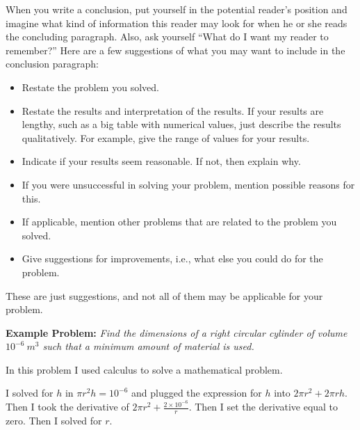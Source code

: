 When you write a conclusion, put yourself in the potential reader's
position and imagine what kind of information this reader may look for
when he or she reads the concluding paragraph.  Also, ask yourself
``What do I want my reader to remember?''  Here are a few suggestions
of what you may want to include in the conclusion paragraph:

\begin{itemize}
\item Restate the problem you solved.
\item Restate the results and interpretation of the results. If your
  results are lengthy, such as a big table with numerical values,
  just  describe the results qualitatively. For example,
  give the range of values for your results.
\item Indicate if your results seem reasonable. If not, then explain why.
\item If you were unsuccessful in solving your problem, mention
  possible reasons for this.
\item If applicable, mention other problems that are related to the
  problem you solved.
\item Give suggestions for improvements, i.e., what else you could do
  for the problem.
\end{itemize}

These are just suggestions, and not all of them may be applicable for
your problem. 




{\bf Example Problem:}
  \emph{Find
        the dimensions of a right circular cylinder of volume
        $10^{-6}\ m^3$ such that a minimum amount of material is
        used.}  

\bigskip

      \begin{badexample}
        In this problem I used calculus to solve a mathematical
        problem.
    \end{badexample}

\bigskip

    \begin{badexample}
      I solved for $h$ in $\pi r^2h=10^{-6}$ and plugged the
      expression for $h$ into $2\pi r^2+2\pi rh$. Then I took the
      derivative of $2\pi r^2+\frac{2\times 10^{-6}}{r}$. Then I set
      the derivative equal to zero. Then I solved for $r$.
    \end{badexample}


